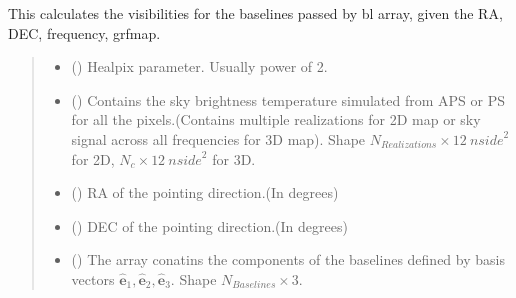 \documentclass[a4paper,11pt,oneside,english,openany]{sphinxmanual}
\begin{document}
\begin{fulllineitems}
\label{\detokenize{simvis:simvis.visgen_mwa_multi}}
\pysigstartsignatures
{}
\pysigstopsignatures
\sphinxAtStartPar
This calculates the visibilities for the baselines passed by bl array, given the RA, DEC, frequency, grfmap.
\begin{quote}\begin{description}
\begin{itemize}
\item {} 
\sphinxAtStartPar
{} () \textendash{} Healpix parameter. Usually power of 2.

\item {} 
\sphinxAtStartPar
{} () \textendash{} Contains the sky brightness temperature simulated from APS or PS for all the pixels.(Contains multiple realizations for 2D map or sky signal across all frequencies for 3D map). Shape \(N_{Realizations}\times 12\ {nside}^2\) for 2D, \(N_{c}\times 12\ {nside}^2\) for 3D.

\item {} 
\sphinxAtStartPar
{} () \textendash{} RA of the pointing direction.(In degrees)

\item {} 
\sphinxAtStartPar
{} () \textendash{} DEC of the pointing direction.(In degrees)

\item {} 
\sphinxAtStartPar
{} () \textendash{} The array conatins the components of the baselines defined by basis vectors \(\hat{\mathbf{e}}_1,\hat{\mathbf{e}}_2,\hat{\mathbf{e}}_3\).
Shape \(N_{Baselines}\times 3\).


\end{itemize}
\end{description}
\end{quote}
\end{fulllineitems}
\end{document}
